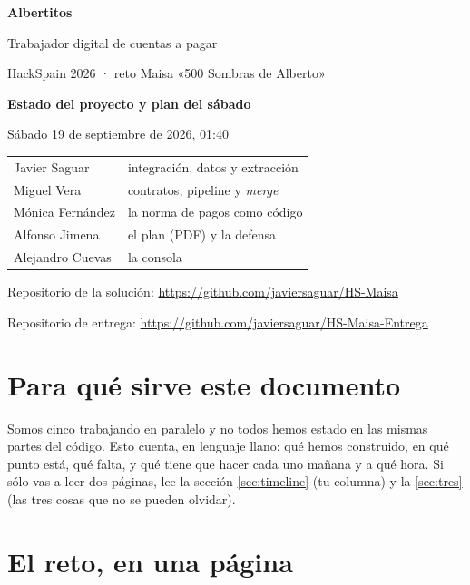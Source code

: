 \documentclass[11pt,a4paper]{article}
\begin{document}
\begin{titlepage}
\centering
\vspace*{2.5cm}
{\color{maisa}\Huge\bfseries Albertitos\par}
\vspace{0.6cm}
{\Large Trabajador digital de cuentas a pagar\par}
\vspace{0.3cm}
{\large HackSpain 2026 · reto Maisa «500 Sombras de Alberto»\par}
\vspace{2cm}
{\large\bfseries Estado del proyecto y plan del sábado\par}
\vspace{0.4cm}
{\normalsize Sábado 19 de septiembre de 2026, 01:40\par}
\vspace{2.5cm}
\begin{tabular}{ll}
\toprule
Javier Saguar & integración, datos y extracción \\
Miguel Vera & contratos, pipeline y \emph{merge} \\
Mónica Fernández & la norma de pagos como código \\
Alfonso Jimena & el plan (PDF) y la defensa \\
Alejandro Cuevas & la consola \\
\bottomrule
\end{tabular}
\vfill
{\small Repositorio de la solución: \url{https://github.com/javiersaguar/HS-Maisa}\par}
{\small Repositorio de entrega: \url{https://github.com/javiersaguar/HS-Maisa-Entrega}\par}
\end{titlepage}

\tableofcontents
\newpage

\section{Para qué sirve este documento}

Somos cinco trabajando en paralelo y no todos hemos estado en las mismas partes del código. Esto cuenta, en
lenguaje llano: qué hemos construido, en qué punto está, qué falta, y qué tiene que hacer cada uno mañana y a
qué hora. Si sólo vas a leer dos páginas, lee la sección \ref{sec:timeline} (tu columna) y la \ref{sec:tres}
(las tres cosas que no se pueden olvidar).

\section{El reto, en una página}
\end{document}
